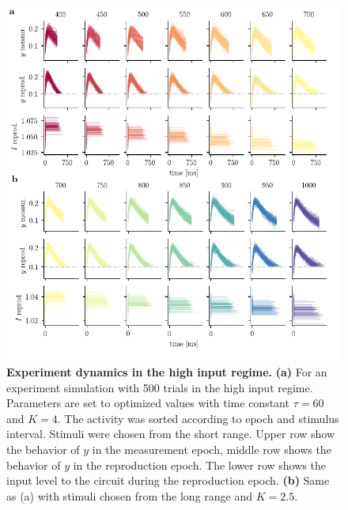 \documentclass[10pt]{article}
\begin{document}
\begin{figure}[!htb]
	\centering
	\includegraphics{figures/supp_experiment_high.pdf}
	\caption{\textbf{Experiment dynamics in the high input regime.} 
	\textbf{(a)} For an experiment simulation with 500 trials in the high input regime. Parameters are set to optimized values with time constant $\tau = 60$ and $K = 4$. The activity was sorted according to epoch and stimulus interval. Stimuli were chosen from the short range. Upper row show the behavior of $y$ in the measurement epoch, middle row shows the behavior of $y$ in the reproduction epoch. The lower row shows the input level to the circuit during the reproduction epoch. 
	\textbf{(b)} Same as (a) with stimuli chosen from the long range and $K = 2.5$.
	}
\label{sup:experiment_high}
\end{figure}
\end{document}
